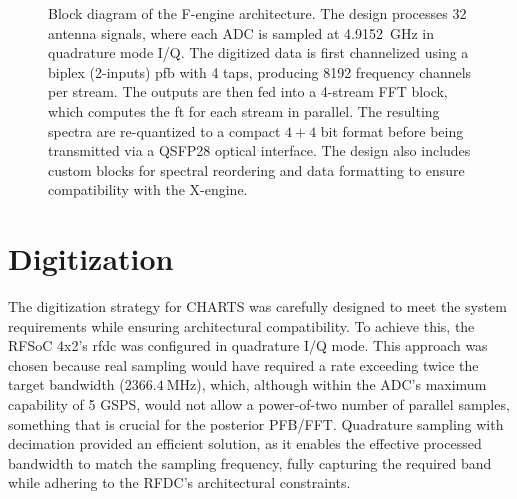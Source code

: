 \begin{figure}[t]
	\caption[Block diagram of the F-engine architecture]{Block diagram of the F-engine architecture. The design processes 32 antenna signals, where each ADC is sampled at \SI{4.9152}{\giga\hertz} in quadrature mode I/Q. The digitized data is first channelized using a biplex (2-inputs) \gls{pfb} with 4 taps, producing 8192 frequency channels per stream. The outputs are then fed into a 4-stream FFT block, which computes the \gls{ft} for each stream in parallel. The resulting spectra are re-quantized to a compact $4+4$ bit format before being transmitted via a QSFP28 optical interface. The design also includes custom blocks for spectral reordering and data formatting to ensure compatibility with the X-engine.}
	\label{fig:f_engine_block_diagram}
\end{figure}


\section{Digitization}
\label{sec:digitization}
The digitization strategy for CHARTS was carefully designed to meet the system requirements while ensuring architectural compatibility. To achieve this, the RFSoC 4x2's \gls{rfdc} was configured in quadrature I/Q mode. This approach was chosen because real sampling would have required a rate exceeding twice the target bandwidth ($\SI{2366.4}{\mega\hertz}$), which, although within the ADC's maximum capability of 5 GSPS, would not allow a power-of-two number of parallel samples, something that is crucial for the posterior PFB/FFT. Quadrature sampling with decimation provided an efficient solution, as it enables the effective processed bandwidth to match the sampling frequency, fully capturing the required band while adhering to the RFDC's architectural constraints.

